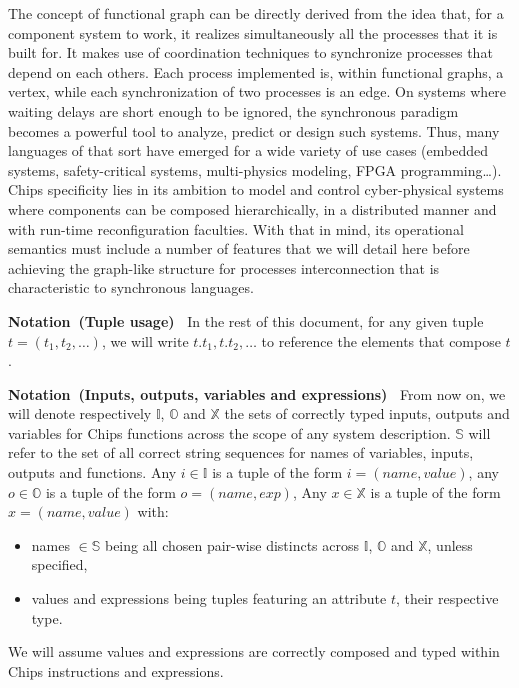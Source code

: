 \documentclass[runningheads]{llncs}
\newcommand{\Notation}[1]{\noindent\textbf{Notation~(#1)~}}
\begin{document}
The concept of functional graph can be directly derived from the idea that, for a component system to work, it realizes simultaneously all the processes that it is built for. It makes use of coordination techniques to synchronize processes that depend on each others. Each process implemented is, within functional graphs, a vertex, while each synchronization of two processes is an edge. On systems where waiting delays are short enough to be ignored, the synchronous paradigm becomes a powerful tool to analyze, predict or design such systems. Thus, many languages of that sort have emerged for a wide variety of use cases (embedded systems, safety-critical systems, multi-physics modeling, FPGA programming\dots)\cite{halbwachs_synchronous_2005,leguernic_programming_1991,bourke_zelus_2013,dragoi_psync_2016,sylvestre_programmation_2024}. Chips specificity lies in its ambition to model and control cyber-physical systems where components can be composed hierarchically, in a distributed manner and with run-time reconfiguration faculties. With that in mind, its operational semantics must include a number of features that we will detail here before achieving the graph-like structure for processes interconnection that is characteristic to synchronous languages.


\Notation{Tuple usage} In the rest of this document, for any given tuple $t = (t_1, t_2, \dots)$, we will write $t.t_1, t.t_2, \dots$ to reference the elements that compose $t$.

\newcommand{\I}{\mathbb{I}}
\renewcommand{\O}{\mathbb{O}}
\newcommand{\X}{\mathbb{X}}
\renewcommand{\S}{\mathbb{S}}
\renewcommand{\F}{\mathbb{F}}

\Notation{Inputs, outputs, variables and expressions} From now on, we will denote respectively $\I$, $\O$ and $\X$ the sets of correctly typed inputs, outputs and variables for Chips functions across the scope of any system description. $\S$ will refer to the set of all correct string sequences for names of variables, inputs, outputs and functions. Any $i \in \I$ is a tuple of the form $i = (name, value)$, any $o \in \O$ is a tuple of the form $o = (name, exp)$, Any $x \in \X$ is a tuple of the form $x = (name, value)$ with:
    \begin{itemize}
        \item names $\in \S$ being all chosen pair-wise distincts across $\I$, $\O$ and $\X$, unless specified,
        \item values and expressions being tuples featuring an attribute $t$, their respective type.
    \end{itemize}
    We will assume values and expressions are correctly composed and typed within Chips instructions and expressions.
\end{document}
